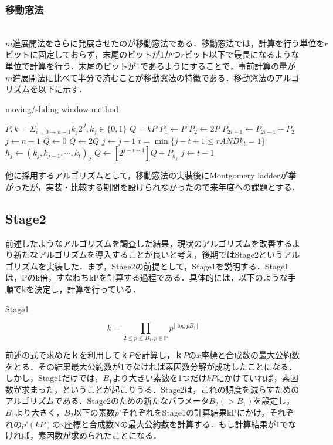 \documentclass[openany,11pt,papersize]{jsbook}
\begin{document}

\subsubsection{移動窓法}
　$m進展開法をさらに発展させたのが移動窓法である．移動窓法では，計算を行う単位をr$ビットに固定しておらず，末尾のビットが1かつ$r$ビット以下で最長になるような単位で計算を行う．末尾のビットが1であるようにすることで，事前計算の量が$m$進展開法に比べて半分で済むことが移動窓法の特徴である．移動窓法のアルゴリズムを以下に示す．
　
\begin{algorithm}[H]                   
\caption{moving/sliding window method}
\label{alg:algW}                          
\begin{algorithmic}                  
\REQUIRE $P, k=\Sigma_{i=0 \rightarrow n-1}k_j 2^J,k_j \in \{0,1\}$
\ENSURE $Q=kP$
\STATE $P_1 \leftarrow P$
\STATE $P_2 \leftarrow 2P$
\STATE $P_{2i+1} \leftarrow P_{2i-1}+P_2$
\ENDFOR
\STATE $j \leftarrow n-1$
\STATE $Q \leftarrow 0$
\STATE $Q \leftarrow 2Q$
\STATE $j \leftarrow j-1$
\ELSE
\STATE $t= \min \{ j-t+1 \leq r AND k_t = 1 \}$
\STATE $h_j \leftarrow ( k_j, k_{j-1},  \cdots , k_t)_2$
\STATE $Q \leftarrow [2^{j-t+1}]Q + P_{h_j}$
\STATE $j \leftarrow t-1$
\ENDIF
\ENDWHILE
\end{algorithmic}
\end{algorithm}

他に採用するアルゴリズムとして，移動窓法の実装後にMontgomery ladderが挙がったが，実装・比較する期間を設けられなかったので来年度への課題とする．

\subsection{Stage2}
前述したようなアルゴリズムを調査した結果，現状のアルゴリズムを改善するより新たなアルゴリズムを導入することが良いと考え，後期ではStage2というアルゴリズムを実装した．まず，Stage2の前提として，Stage1を説明する．Stage1は，Pのk倍，すなわちkPを計算する過程である．具体的には，以下のような手順でkを決定し，計算を行っている．

\begin{itembox}[l]{Stage1}
\begin{center}
\[
k = \prod_{2 \leq p \leq B_1, p \in \mathbb{P}} p^{\lfloor \log{p} B_1 \rfloor}
\]
\end{center}
\end{itembox}

前述の式で求めた$ｋを利用してｋP$を計算し，$ｋPのx$座標と合成数の最大公約数をとる．その結果最大公約数が1でなければ素因数分解が成功したことになる．しかし，Stage1だけでは，$B_1$より大きい素数を1つだけ$kP$にかけていれば，素因数が求まった，ということが起こりうる．Stage2は，これの頻度を減らすためのアルゴリズムである．Stage2のための新たなパラメータ$B_2(> B_1)$を設定し，$B_1より大きく，B_2$以下の素数$p’$それぞれをStage1の計算結果kPにかけ，それぞれの$p’(kP)$のx座標と合成数Nの最大公約数を計算する．もし計算結果が1でなければ，素因数が求められたことになる．
\end{document}
